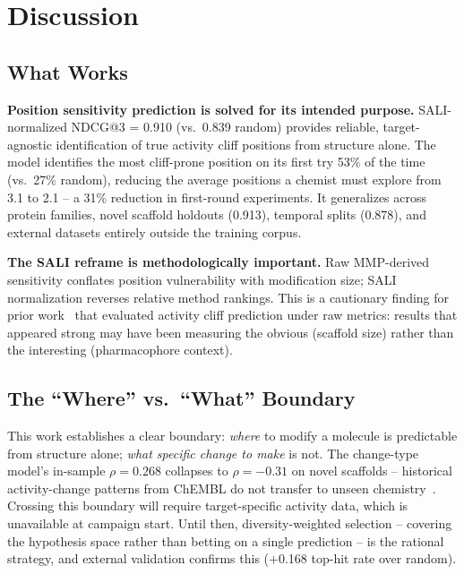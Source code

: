 \documentclass[sigconf, nonacm]{acmart}
\begin{document}
\section{Discussion}

\subsection{What Works}

\textbf{Position sensitivity prediction is solved for its intended purpose.} SALI-normalized NDCG@3 = 0.910 (vs.\ 0.839 random) provides reliable, target-agnostic identification of true activity cliff positions from structure alone. The model identifies the most cliff-prone position on its first try 53\% of the time (vs.\ 27\% random), reducing the average positions a chemist must explore from 3.1 to 2.1 -- a 31\% reduction in first-round experiments. It generalizes across protein families, novel scaffold holdouts (0.913), temporal splits (0.878), and external datasets entirely outside the training corpus.

\textbf{The SALI reframe is methodologically important.} Raw MMP-derived sensitivity conflates position vulnerability with modification size; SALI normalization reverses relative method rankings. This is a cautionary finding for prior work~\cite{Stumpfe2012,vanTilborg2022} that evaluated activity cliff prediction under raw metrics: results that appeared strong may have been measuring the obvious (scaffold size) rather than the interesting (pharmacophore context).

\subsection{The ``Where'' vs.\ ``What'' Boundary}

This work establishes a clear boundary: \textit{where} to modify a molecule is predictable from structure alone; \textit{what specific change to make} is not. The change-type model's in-sample $\rho = 0.268$ collapses to $\rho = -0.31$ on novel scaffolds -- historical activity-change patterns from ChEMBL do not transfer to unseen chemistry~\cite{Tyrchan2017}. Crossing this boundary will require target-specific activity data, which is unavailable at campaign start. Until then, diversity-weighted selection -- covering the hypothesis space rather than betting on a single prediction -- is the rational strategy, and external validation confirms this ($+$0.168 top-hit rate over random).
\end{document}
